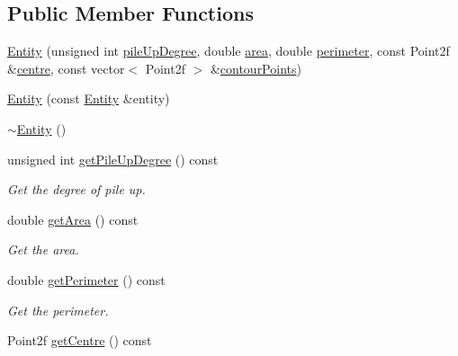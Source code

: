 \subsection*{\-Public \-Member \-Functions}
\begin{DoxyCompactItemize}
\item 
\hyperlink{classmultiscale_1_1analysis_1_1Entity_ab6e9d348e41c7670d52ca2615cdee023}{\-Entity} (unsigned int \hyperlink{classmultiscale_1_1analysis_1_1Entity_aae78866cef9fcb7bd2e858570f47d082}{pile\-Up\-Degree}, double \hyperlink{classmultiscale_1_1analysis_1_1Entity_a7fad3c67bb46cc0f4ce1fb17ef3e66cc}{area}, double \hyperlink{classmultiscale_1_1analysis_1_1Entity_ac7bcdb1cb5eb4369ca8e44d3dbda44a3}{perimeter}, const \-Point2f \&\hyperlink{classmultiscale_1_1analysis_1_1Entity_ad226609174b21f71210161d29a16d4ef}{centre}, const vector$<$ \-Point2f $>$ \&\hyperlink{classmultiscale_1_1analysis_1_1Entity_a0199b0a0e5b22809015ecbc23d17785e}{contour\-Points})
\item 
\hyperlink{classmultiscale_1_1analysis_1_1Entity_ab7136fc011809bc9bcc43862fd4c38ae}{\-Entity} (const \hyperlink{classmultiscale_1_1analysis_1_1Entity}{\-Entity} \&entity)
\item 
\hyperlink{classmultiscale_1_1analysis_1_1Entity_adf6d3f7cb1b2ba029b6b048a395cc8ae}{$\sim$\-Entity} ()
\item 
unsigned int \hyperlink{classmultiscale_1_1analysis_1_1Entity_a9984244109e4212e310b0418e894a8c1}{get\-Pile\-Up\-Degree} () const 
\begin{DoxyCompactList}\small\item\em \-Get the degree of pile up. \end{DoxyCompactList}\item 
double \hyperlink{classmultiscale_1_1analysis_1_1Entity_a5daf3865a5f3bfd4d4dd2fe0262af889}{get\-Area} () const 
\begin{DoxyCompactList}\small\item\em \-Get the area. \end{DoxyCompactList}\item 
double \hyperlink{classmultiscale_1_1analysis_1_1Entity_ae73ee40bc7adb95614551d6da4b4a4ff}{get\-Perimeter} () const 
\begin{DoxyCompactList}\small\item\em \-Get the perimeter. \end{DoxyCompactList}\item 
\-Point2f \hyperlink{classmultiscale_1_1analysis_1_1Entity_ab1f9c4810a5f3d2b58fb6f813354821f}{get\-Centre} () const 

\end{DoxyCompactItemize}
